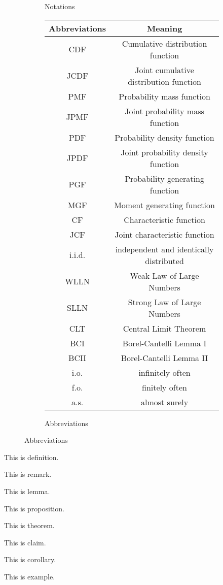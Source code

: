 \documentclass{huhtakm-template-book}
\begin{document}
\begin{figure}[h]
\begin{subfigure}{0.45\textwidth}
\begin{tabular}{cc}
        \end{tabular}
        \caption{Notations}
    \end{subfigure}
    \begin{subfigure}{0.45\textwidth}
        \centering
        \begin{tabular}{cc}
            Abbreviations & Meaning\\
            \hline
            CDF & Cumulative distribution function\\
            JCDF & Joint cumulative distribution function\\
            PMF & Probability mass function\\
            JPMF & Joint probability mass function\\
            PDF & Probability density function\\
            JPDF & Joint probability density function\\
            PGF & Probability generating function\\
            MGF & Moment generating function\\
            CF & Characteristic function\\
            JCF & Joint characteristic function\\
            i.i.d. & independent and identically distributed\\
            WLLN & Weak Law of Large Numbers\\
            SLLN & Strong Law of Large Numbers\\
            CLT & Central Limit Theorem\\
            BCI & Borel-Cantelli Lemma I\\
            BCII & Borel-Cantelli Lemma II\\
            i.o. & infinitely often\\
            f.o. & finitely often\\
            a.s. & almost surely
        \end{tabular}
        \caption{Abbreviations}
    \end{subfigure}
\end{figure}
\begin{defn}
    This is definition.
\end{defn}
\begin{rem}
    This is remark.
\end{rem}
\begin{lem}
    This is lemma.
\end{lem}
\begin{prop}
    This is proposition.
\end{prop}
\begin{thm}
    This is theorem.
\end{thm}
\begin{cla}
    This is claim.
\end{cla}
\begin{cor}
    This is corollary.
\end{cor}
\begin{eg}
    This is example.
\end{eg}
\tableofcontents
\end{document}
